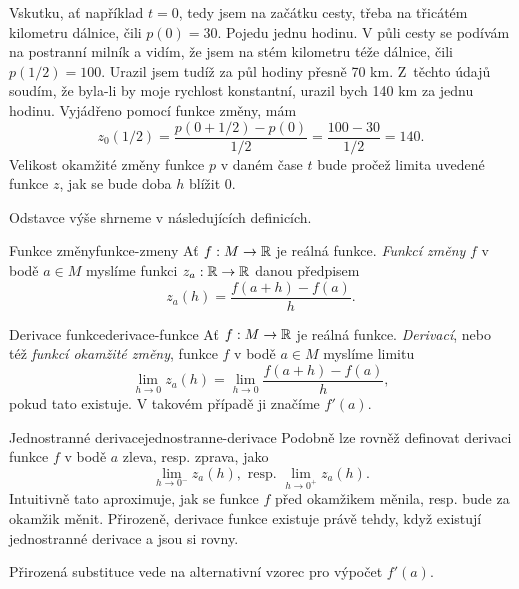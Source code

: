 Vskutku, ať například $t = 0$, tedy jsem na začátku cesty, třeba na třicátém
kilometru dálnice, čili $p(0) = 30$. Pojedu jednu hodinu. V půli cesty se
podívám na postranní milník a vidím, že jsem na stém kilometru téže dálnice,
čili $p(1 / 2) = 100$. Urazil jsem tudíž za půl hodiny přesně 70 km. Z~těchto
údajů soudím, že byla-li by moje rychlost konstantní, urazil bych 140 km za
jednu hodinu. Vyjádřeno pomocí funkce změny, mám
\[
 z_0(1 / 2) = \frac{p(0 + 1 / 2) - p(0)}{1 / 2} = \frac{100 - 30}{1 / 2} = 140.
\]
Velikost okamžité změny funkce $p$ v daném čase $t$ bude pročež limita uvedené
funkce $z$, jak se bude doba $h$ blížit $0$.

Odstavce výše shrneme v následujících definicích.

\begin{definition}{Funkce změny}{funkce-zmeny}
 Ať $f:M \to \mathbb{R}$ je reálná funkce. \emph{Funkcí změny} $f$ v bodě $a \in M$
 myslíme funkci $z_a:\mathbb{R} \to \mathbb{R}$ danou předpisem
 \[
  z_a(h) = \frac{f(a + h) - f(a)}{h}.
 \]
\end{definition}

\begin{definition}{Derivace funkce}{derivace-funkce}
 Ať $f:M \to \mathbb{R}$ je reálná funkce. \emph{Derivací}, nebo též \emph{funkcí
 okamžité změny}, funkce $f$ v bodě $a \in M$ myslíme limitu
 \[
  \lim_{h \to 0} z_a(h) = \lim_{h \to 0} \frac{f(a + h) - f(a)}{h},
 \]
 pokud tato existuje. V takovém případě ji značíme $f'(a)$.
\end{definition}

\begin{remark}{Jednostranné derivace}{jednostranne-derivace}
 Podobně lze rovněž definovat derivaci funkce $f$ v bodě $a$ zleva, resp.
 zprava, jako
 \[
  \lim_{h \to 0^{-}} z_a(h), \text{ resp. } \lim_{h \to 0^{+}} z_a(h).
 \]
 Intuitivně tato aproximuje, jak se funkce $f$ před okamžikem měnila, resp. bude
 za okamžik měnit. Přirozeně, derivace funkce existuje právě tehdy, když
 existují jednostranné derivace a jsou si rovny.
\end{remark}

Přirozená substituce vede na alternativní vzorec pro výpočet $f'(a)$.

